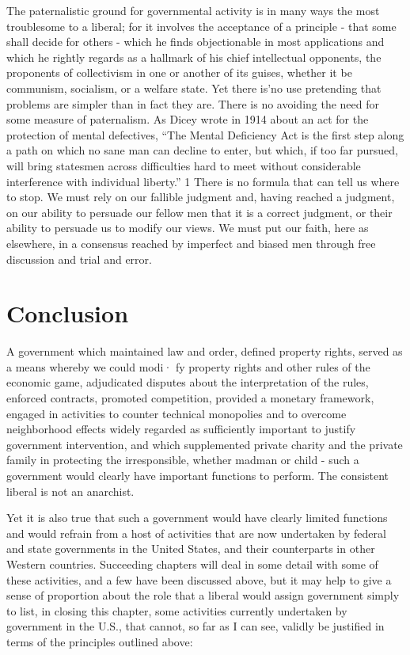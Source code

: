 \documentclass[11pt,openany]{book}
\newcommand{\booksection}[1]{%
  \phantomsection\section*{#1}%
  \addcontentsline{toc}{section}{#1}\markright{#1}}
\begin{document}
The paternalistic ground for governmental activity is in many ways the most troublesome to a liberal; for it involves the acceptance of a principle - that some shall decide for others - which he finds objectionable in most applications and which he rightly regards as a hallmark of his chief intellectual opponents, the proponents of collectivism in one or another of its guises, whether it be communism, socialism, or a welfare state. Yet there is'no use pretending that problems are simpler than in fact they are. There is no avoiding the need for some measure of paternalism. As Dicey wrote in 1914 about an act for the protection of mental defectives, ``The Mental Deficiency Act is the first step along a path on which no sane man can decline to enter, but which, if too far pursued, will bring statesmen across difficulties hard to meet without considerable interference with individual liberty.'' 1 There is no formula that can tell us where to stop. We must rely on our fallible judgment and, having reached a judgment, on our ability to persuade our fellow men that it is a correct judgment, or their ability to persuade us to modify our views. We must put our faith, here as elsewhere, in a consensus reached by imperfect and biased men through free discussion and trial and error.

\booksection{Conclusion}

A government which maintained law and order, defined property rights, served as a means whereby we could modi· fy property rights and other rules of the economic game, adjudicated disputes about the interpretation of the rules, enforced contracts, promoted competition, provided a monetary framework, engaged in activities to counter technical monopolies and to overcome neighborhood effects widely regarded as sufficiently important to justify government intervention, and which supplemented private charity and the private family in protecting the irresponsible, whether madman or child - such a government would clearly have important functions to perform. The consistent liberal is not an anarchist.

Yet it is also true that such a government would have clearly limited functions and would refrain from a host of activities that are now undertaken by federal and state governments in the United States, and their counterparts in other Western countries. Succeeding chapters will deal in some detail with some of these activities, and a few have been discussed above, but it may help to give a sense of proportion about the role that a liberal would assign government simply to list, in closing this chapter, some activities currently undertaken by government in the U.S., that cannot, so far as I can see, validly be justified in terms of the principles outlined above:
\end{document}
